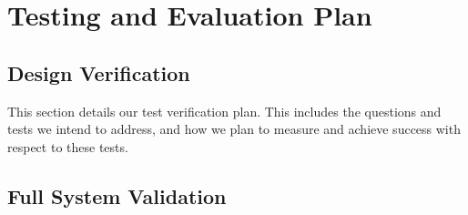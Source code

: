 
\section{Testing and Evaluation Plan}
\label{sec:te_plan}

\subsection{Design Verification}

This section details our test verification plan. This includes the questions and tests we intend to address, and how we plan to measure and achieve success with respect to these tests.

\label{sec:verification}









\subsection{Full System Validation}
\label{sec:system_validation}
